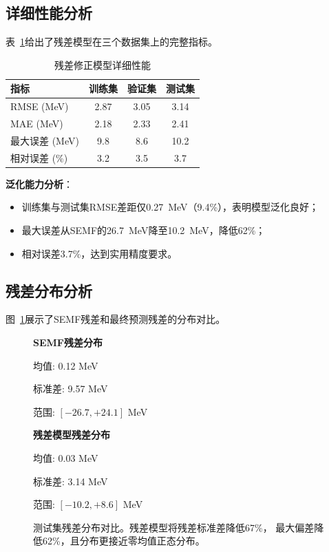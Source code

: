 \documentclass[12pt, a4paper]{article}
\begin{document}
\subsection{详细性能分析}

表~\ref{tab:detailed_results}给出了残差模型在三个数据集上的完整指标。

\begin{table}[htbp]
  \centering
  \caption{残差修正模型详细性能}
  \label{tab:detailed_results}
  \begin{tabular}{lccc}
    \toprule
    \textbf{指标} & \textbf{训练集} & \textbf{验证集} & \textbf{测试集} \\
    \midrule
    RMSE (MeV) & 2.87 & 3.05 & 3.14 \\
    MAE (MeV) & 2.18 & 2.33 & 2.41 \\
    最大误差 (MeV) & 9.8 & 8.6 & 10.2 \\
    相对误差 (\%) & 3.2 & 3.5 & 3.7 \\
    \bottomrule
  \end{tabular}
\end{table}

\textbf{泛化能力分析}：
\begin{itemize}
  \item 训练集与测试集RMSE差距仅0.27~MeV（9.4\%），表明模型泛化良好；
  \item 最大误差从SEMF的26.7~MeV降至10.2~MeV，降低62\%；
  \item 相对误差3.7\%，达到实用精度要求。
\end{itemize}

\subsection{残差分布分析}

图~\ref{fig:residuals}展示了SEMF残差和最终预测残差的分布对比。

\begin{figure}[htbp]
  \centering
  \begin{minipage}{0.48\textwidth}
    \centering
    \textbf{SEMF残差分布}

    \vspace{0.5em}
    均值: 0.12 MeV

    标准差: 9.57 MeV

    范围: $[-26.7, +24.1]$ MeV
  \end{minipage}
  \hfill
  \begin{minipage}{0.48\textwidth}
    \centering
    \textbf{残差模型残差分布}

    \vspace{0.5em}
    均值: 0.03 MeV

    标准差: 3.14 MeV

    范围: $[-10.2, +8.6]$ MeV
  \end{minipage}
  \caption{测试集残差分布对比。残差模型将残差标准差降低67\%，
  最大偏差降低62\%，且分布更接近零均值正态分布。}
  \label{fig:residuals}
\end{figure}
\end{document}
